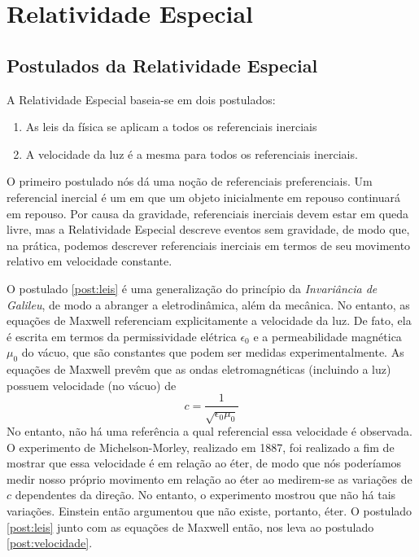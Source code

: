 \chapter{Relatividade Especial}\label{cap:RelatividadeEspecial}

\section{Postulados da Relatividade Especial}\label{sec:PostuladosRelatividadeEspecial}

A Relatividade Especial baseia-se em dois postulados:

\begin{enumerate}[label=\textbf{(\Roman*)}]
    \item As leis da física se aplicam a todos os referenciais inerciais \label{post:leis}
    \item A velocidade da luz é a mesma para todos os referenciais inerciais. \label{post:velocidade}
\end{enumerate}

O primeiro postulado nós dá uma noção de referenciais preferenciais. Um referencial inercial é um em que um objeto inicialmente em repouso continuará em repouso. Por causa da gravidade, referenciais inerciais devem estar em queda livre, mas a Relatividade Especial descreve eventos sem gravidade, de modo que, na prática, podemos descrever referenciais inerciais em termos de seu movimento relativo em velocidade constante.

O postulado \ref{post:leis} é uma generalização do princípio da \textit{Invariância de Galileu}, de modo a abranger a eletrodinâmica, além da mecânica. No entanto, as equações de Maxwell referenciam explicitamente a velocidade da luz. De fato, ela é escrita em termos da permissividade elétrica $\epsilon_0$ e a permeabilidade magnética $\mu_0$ do vácuo, que são constantes que podem ser medidas experimentalmente. As equações de Maxwell prevêm que as ondas eletromagnéticas (incluindo a luz) possuem velocidade (no vácuo) de 
\[
    c = \frac{1}{\sqrt{\epsilon_0\mu_0}}
\]
No entanto, não há uma referência a qual referencial essa velocidade é observada. O experimento de Michelson-Morley, realizado em 1887, foi realizado a fim de mostrar que essa velocidade é em relação ao éter, de modo que nós poderíamos medir nosso próprio movimento em relação ao éter ao medirem-se as variações de $c$ dependentes da direção. No entanto, o experimento mostrou que não há tais variações. Einstein então argumentou que não existe, portanto, éter. O postulado \ref{post:leis} junto com as equações de Maxwell então, nos leva ao postulado \ref{post:velocidade}.

